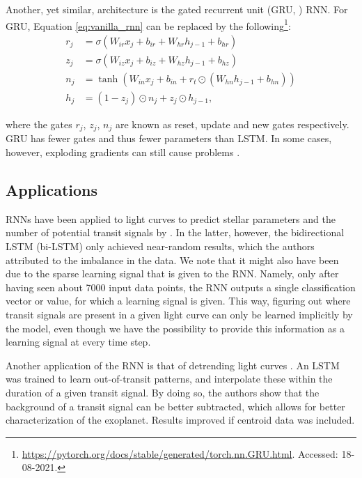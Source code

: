 Another, yet similar, architecture is the gated recurrent unit (GRU, \cite{cho2014learning}) RNN. For GRU, Equation \ref{eq:vanilla_rnn} can be replaced by the following\footnote{\url{https://pytorch.org/docs/stable/generated/torch.nn.GRU.html}. Accessed: 18-08-2021.}:
\begin{align}
    r_j &= \sigma(W_{ir}x_j + b_{ir} + W_{hr}h_{j-1} + b_{hr}) \\
    z_j &= \sigma(W_{iz}x_j + b_{iz} + W_{hz}h_{j-1} + b_{hz}) \\   
    n_j &= \tanh(W_{in}x_j + b_{in} + r_t \odot (W_{hn}h_{j-1} + b_{hn})) \\
    h_j &= (1 - z_j) \odot n_j + z_j \odot h_{j-1},
\end{align}

\noindent where the gates $r_j$, $z_j$, $n_j$ are known as reset, update and new gates respectively. GRU has fewer gates and thus fewer parameters than LSTM. In some cases, however, exploding gradients can still cause problems \citep{kanai2017preventing}. 

\subsection{Applications}

RNNs have been applied to light curves to predict stellar parameters and the number of potential transit signals by \cite{hinners2018machine}. In the latter, however, the bidirectional LSTM (bi-LSTM) only achieved near-random results, which the authors attributed to the imbalance in the data. We note that it might also have been due to the sparse learning signal that is given to the RNN. Namely, only after having seen about 7000 input data points, the RNN outputs a single classification vector or value, for which a learning signal is given. This way, figuring out where transit signals are present in a given light curve can only be learned implicitly by the model, even though we have the possibility to provide this information as a learning signal at every time step.

Another application of the RNN is that of detrending light curves \citep{morvan2020detrending}. An LSTM was trained to learn out-of-transit patterns, and interpolate these within the duration of a given transit signal. By doing so, the authors show that the background of a transit signal can be better subtracted, which allows for better characterization of the exoplanet. Results improved if centroid data was included.

